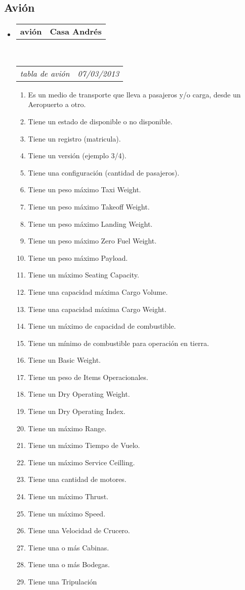 \documentclass[10pt,letterpaper]{article}
\makeatletter
\newcommand{\headerrow}[2]
{\begin{tabular*}{\linewidth}{l@{\extracolsep{\fill}}r}
	#1 &
	#2 \\
\end{tabular*}}
\makeatother
\begin{document}
\subsection*{Avión}

\begin{itemize}
	\parskip=0.1em

	\item
	\headerrow
		{\textbf{avión}}
		{\textbf{Casa Andrés}}
	\\
	\headerrow
		{\emph{tabla de avión}}
		{\emph{07/03/2013}}
	\begin{enumerate}
		\item Es un medio de transporte que lleva a pasajeros y/o carga, desde un Aeropuerto a otro.
		\item Tiene un estado de disponible o no disponible.
		\item Tiene un registro (matricula).
		\item Tiene un versión (ejemplo 3/4).
		\item Tiene una configuración (cantidad de pasajeros).
		\item Tiene un peso máximo Taxi Weight.
		\item Tiene un peso máximo Takeoff Weight.
		\item Tiene un peso máximo Landing Weight.
		\item Tiene un peso máximo Zero Fuel Weight.
		\item Tiene un peso máximo Payload.
		\item Tiene un máximo Seating Capacity.
		\item Tiene una capacidad máxima Cargo Volume.
		\item Tiene una capacidad máxima Cargo Weight.
		\item Tiene un máximo de capacidad de combustible.
		\item Tiene un mínimo de combustible para operación en tierra.
		\item Tiene un Basic Weight.
		\item Tiene un peso de Items Operacionales.
		\item Tiene un Dry Operating Weight.		
		\item Tiene un Dry Operating Index.
		\item Tiene un máximo Range.
		\item Tiene un máximo Tiempo de Vuelo.
		\item Tiene un máximo Service Ceilling.
		\item Tiene una cantidad de motores.
		\item Tiene un máximo Thrust.		
		\item Tiene un máximo Speed.
		\item Tiene una Velocidad de Crucero.
		\item Tiene una o más Cabinas.
		\item Tiene una o más Bodegas.
		\item Tiene una Tripulación
	\end{enumerate}

\end{itemize}
\end{document}
